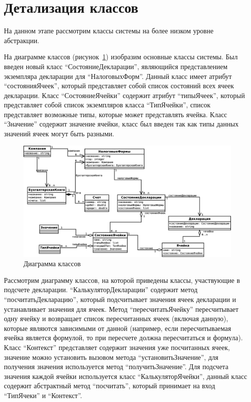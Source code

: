 \documentclass[14pt,a4paper]{reportmod}
\begin{document}
\section{Детализация классов}
На данном этапе рассмотрим классы системы на более низком уровне абстракции.

На диаграмме классов (рисунок~\ref{pic:classes_1}) изобразим основные классы системы. Был введен новый класс ``СостояниеДекларации'', являющийся представлением экземпляра декларации для ``НалоговыхФорм''. Данный класс имеет атрибут ``состоянияЯчеек'', который представляет собой список состояний всех ячеек декларации. Класс ``СостояниеЯчейки'' содержит атрибут ``типыЯчеек'', который представляет собой список экземпляров класса ``ТипЯчейки'', список представляет возможные типы, которые может представлять ячейка. Класс ``Значение'' содержит значение ячейки, класс был введен так как типы данных значений ячеек могут быть разными.

\begin{figure}
  \centering
  \includegraphics[scale=0.4]{uml/_classes_1}
  \caption{Диаграмма классов}
  \label{pic:classes_1}
\end{figure}


Рассмотрим диаграмму классов, на которой приведены классы, участвующие в подсчете декларации. ``КалькуляторДекларации'' содержит метод ``посчитатьДекларацию'', который подсчитывает значения ячеек декларации и устанавливает значения для ячеек. Метод ``пересчитатьЯчейку'' пересчитывает одну ячейку и возвращает список пересчитанных ячеек (включая данную), которые являются зависимыми от данной (например, если пересчитываемая ячейка является формулой, то при пересчете должна пересчитаться и формула). Класс ``Контекст'' представляет содержит значения уже посчитанных ячеек, значение можно установить вызовом метода ``установитьЗначение'', для получения значения используется метод ``получитьЗначение''. Для подсчета значения каждой ячейки используется класс ``КалькуляторЯчейки'', данный класс содержит абстрактный метод ``посчитать'', который принимает на вход ``ТипЯчеки'' и ``Контекст''.
\end{document}
